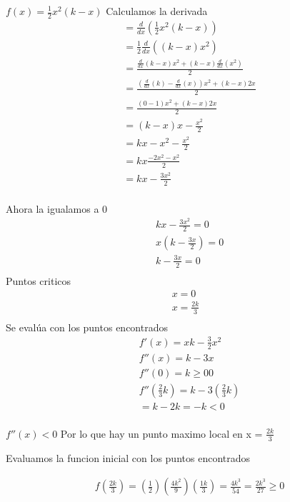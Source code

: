 \documentclass{report}
\begin{document}
{    $f(x) = \frac{1}{2}x^2(k-x) $
    Calculamos la derivada\\
    \begin{align*}
     &= \frac{d}{dx}\left( \frac{1}{2}x^2(k-x) \right)\\
     &= \frac{1}{2}\frac{d}{dx}\left((k-x)x^2\right)\\
     &= \frac{\frac{d}{dx} \left(k-x\right) x^2 +(k-x)\frac{d}{dx}(x^2)}{2}\\
     &= \frac{\left(\frac{d}{dx} (k) -\frac{d}{dx} (x) \right) x^2 +(k-x) 2x}{2}\\
     &= \frac{(0-1)x^2 + (k-x) 2x}{2}\\
     &= (k-x)x -\frac{x^2}{2}\\
     &= kx-x^2 - \frac{x^2}{2}\\
     &= kx \frac{-2x^2-x^2}{2}\\
     &= kx -\frac{3x^2}{2}\\
     \end{align*}
 
     Ahora la igualamos a  0
     \begin{align*}
          &kx -\frac{3x^2}{2}= 0\\
          &x \left( k -\frac{3x}{2} \right)= 0\\
          & k -\frac{3x}{2} = 0\\
     \end{align*}
     Puntos criticos
     \begin{align*}
          x  = 0\\
          x = \frac{2k}{3}\\
     \end{align*}
     Se evalúa con los puntos encontrados
     \begin{align*}
          & f'(x) = xk -\frac{3}{2}x^2\\
          &f''(x) = k -3x \\
          &f''(0) = k \geq 0 0 \\
          &f''\left(\frac{2}{3}k\right)= k -3 \left(\frac{2}{3}k\right)\\
          & = k-2k = -k < 0\\
     \end{align*}

     $f''(x) < 0$ Por lo que hay un punto maximo local en x = $\frac{2k}{3} $

     Evaluamos la funcion inicial con los puntos encontrados

     \begin{align*}
         & f\left(\frac{2k}{3}\right) =\left(\frac{1}{2}\right) \left(\frac{4k^2}{9} \right) \left(\frac{1k}{3}\right)  = \frac{4k^3}{54}  =\frac{2k^3}{27} \geq 0
     \end{align*}

     
     
}
\end{document}
